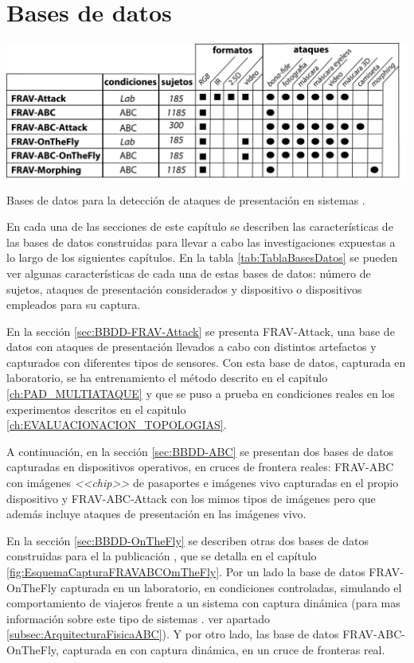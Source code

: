 \chapter{Bases de datos}\label{ch:BBDDs}

\begin{table}[ht!]
     \centering
     \includegraphics[width=1\textwidth]{ch-sistemasABC/images/ch-BBDDs/TABLA_BASES_DE_DATOS.png}
     \caption{Bases de datos para la detección de ataques de presentación en sistemas .}
     \label{tab:TablaBasesDatos}
\end{table}

En cada una de las secciones de este capítulo se describen las características de las bases de datos construidas para llevar a cabo las investigaciones expuestas a lo largo de los siguientes capítulos. En la tabla \ref{tab:TablaBasesDatos} se pueden ver algunas características de cada una de estas bases de datos: número de sujetos, ataques de presentación considerados y dispositivo o dispositivos empleados para su captura.

En la sección \ref{sec:BBDD-FRAV-Attack} se presenta \Gls{FRAV-Attack}, una base de datos con ataques de presentación llevados a cabo con distintos artefactos y capturados con diferentes tipos de sensores. Con esta base de datos, capturada en laboratorio, se ha entrenamiento el método  descrito en el capitulo \ref{ch:PAD_MULTIATAQUE} y que se puso a prueba en condiciones reales en los experimentos descritos en el capitulo \ref{ch:EVALUACIONACION_TOPOLOGIAS}. 


A continuación, en la sección \ref{sec:BBDD-ABC} se presentan dos bases de datos capturadas en dispositivos  operativos, en cruces de frontera reales: \Gls{FRAV-ABC} con imágenes \textit{<<\gls{chip}>>} de pasaportes e imágenes \gls{vivo} capturadas en el propio dispositivo y \Gls{FRAV-ABC-Attack} con los mimos tipos de imágenes pero que además incluye ataques de presentación en las imágenes \gls{vivo}.

En la sección \ref{sec:BBDD-OnTheFly} se describen otras dos bases de datos construidas para el la publicación \cite{ortega2020dynamic}, que se detalla en el capítulo \ref{fig:EsquemaCapturaFRAVABCOmTheFly}. Por un lado la base de datos \Gls{FRAV-OnTheFly} capturada en un laboratorio, en condiciones controladas, simulando el comportamiento de viajeros frente a un sistema  con captura dinámica (para mas información sobre este tipo de sistemas . ver apartado \ref{subsec:ArquitecturaFisicaABC}). Y por otro lado, las base de datos \Gls{FRAV-ABC-OnTheFly}, capturada en  con captura dinámica, en un cruce de fronteras real.

